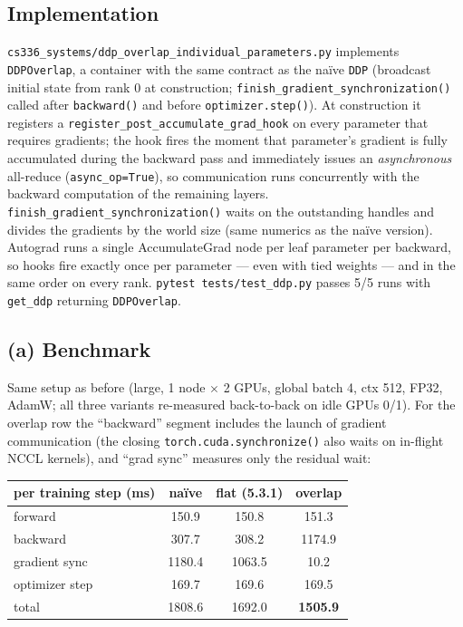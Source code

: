 \documentclass[11pt]{article}
\newcommand{\code}[1]{\texttt{#1}}
\begin{document}
\subsection{Implementation}

\code{cs336\_systems/ddp\_overlap\_individual\_parameters.py} implements \code{DDPOverlap}, a
container with the same contract as the na\"ive \code{DDP} (broadcast initial state from rank 0 at
construction; \code{finish\_gradient\_synchronization()} called after \code{backward()} and before
\code{optimizer.step()}). At construction it registers a
\code{register\_post\_accumulate\_grad\_hook} on every parameter that requires gradients; the hook
fires the moment that parameter's gradient is fully accumulated during the backward pass and
immediately issues an \emph{asynchronous} all-reduce (\code{async\_op=True}), so communication runs
concurrently with the backward computation of the remaining layers.
\code{finish\_gradient\_synchronization()} waits on the outstanding handles and divides the
gradients by the world size (same numerics as the na\"ive version). Autograd runs a single
AccumulateGrad node per leaf parameter per backward, so hooks fire exactly once per parameter ---
even with tied weights --- and in the same order on every rank. \code{pytest tests/test\_ddp.py}
passes 5/5 runs with \code{get\_ddp} returning \code{DDPOverlap}.

\subsection{(a) Benchmark}

Same setup as before (large, 1 node $\times$ 2 GPUs, global batch 4, ctx 512, FP32, AdamW; all
three variants re-measured back-to-back on idle GPUs 0/1). For the overlap row the ``backward''
segment includes the launch of gradient communication (the closing \code{torch.cuda.synchronize()}
also waits on in-flight NCCL kernels), and ``grad sync'' measures only the residual wait:

\begin{center}\small
\begin{tabular}{lccc}
\toprule
per training step (ms) & na\"ive & flat (5.3.1) & overlap \\
\midrule
forward            & 150.9  & 150.8  & 151.3 \\
backward           & 307.7  & 308.2  & 1174.9 \\
gradient sync      & 1180.4 & 1063.5 & 10.2 \\
optimizer step     & 169.7  & 169.6  & 169.5 \\
\midrule
total              & 1808.6 & 1692.0 & \textbf{1505.9} \\
\bottomrule
\end{tabular}
\end{center}
\end{document}

